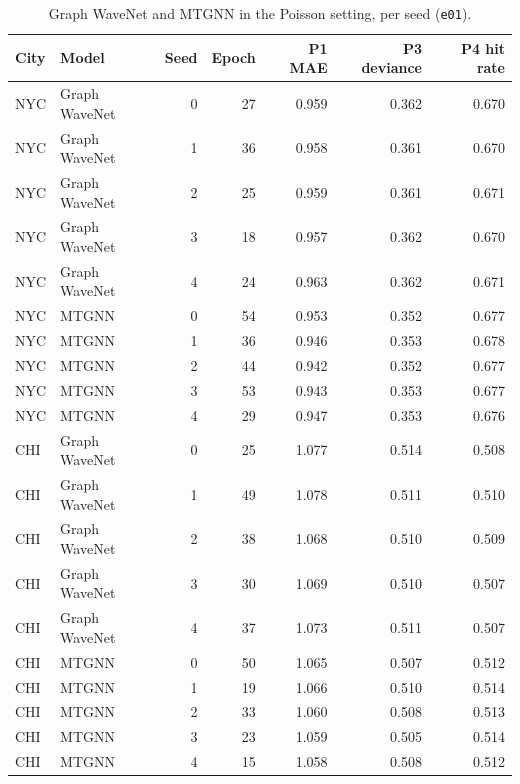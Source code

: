 \documentclass[11pt]{article}
\begin{document}
\begin{table}[H]\centering\scriptsize\setlength{\tabcolsep}{3pt}
\caption{Graph WaveNet and MTGNN in the Poisson setting, per seed (\texttt{e01}).}\label{tab:s10}
\begin{tabularx}{\linewidth}{llrrrrr}\toprule
City & Model & Seed & Epoch & P1 MAE & P3 deviance & P4 hit rate\\\midrule
NYC & Graph WaveNet & 0 & 27 & 0.959 & 0.362 & 0.670 \\
NYC & Graph WaveNet & 1 & 36 & 0.958 & 0.361 & 0.670 \\
NYC & Graph WaveNet & 2 & 25 & 0.959 & 0.361 & 0.671 \\
NYC & Graph WaveNet & 3 & 18 & 0.957 & 0.362 & 0.670 \\
NYC & Graph WaveNet & 4 & 24 & 0.963 & 0.362 & 0.671 \\
NYC & MTGNN & 0 & 54 & 0.953 & 0.352 & 0.677 \\
NYC & MTGNN & 1 & 36 & 0.946 & 0.353 & 0.678 \\
NYC & MTGNN & 2 & 44 & 0.942 & 0.352 & 0.677 \\
NYC & MTGNN & 3 & 53 & 0.943 & 0.353 & 0.677 \\
NYC & MTGNN & 4 & 29 & 0.947 & 0.353 & 0.676 \\
CHI & Graph WaveNet & 0 & 25 & 1.077 & 0.514 & 0.508 \\
CHI & Graph WaveNet & 1 & 49 & 1.078 & 0.511 & 0.510 \\
CHI & Graph WaveNet & 2 & 38 & 1.068 & 0.510 & 0.509 \\
CHI & Graph WaveNet & 3 & 30 & 1.069 & 0.510 & 0.507 \\
CHI & Graph WaveNet & 4 & 37 & 1.073 & 0.511 & 0.507 \\
CHI & MTGNN & 0 & 50 & 1.065 & 0.507 & 0.512 \\
CHI & MTGNN & 1 & 19 & 1.066 & 0.510 & 0.514 \\
CHI & MTGNN & 2 & 33 & 1.060 & 0.508 & 0.513 \\
CHI & MTGNN & 3 & 23 & 1.059 & 0.505 & 0.514 \\
CHI & MTGNN & 4 & 15 & 1.058 & 0.508 & 0.512 \\
\bottomrule\end{tabularx}\end{table}
\end{document}
